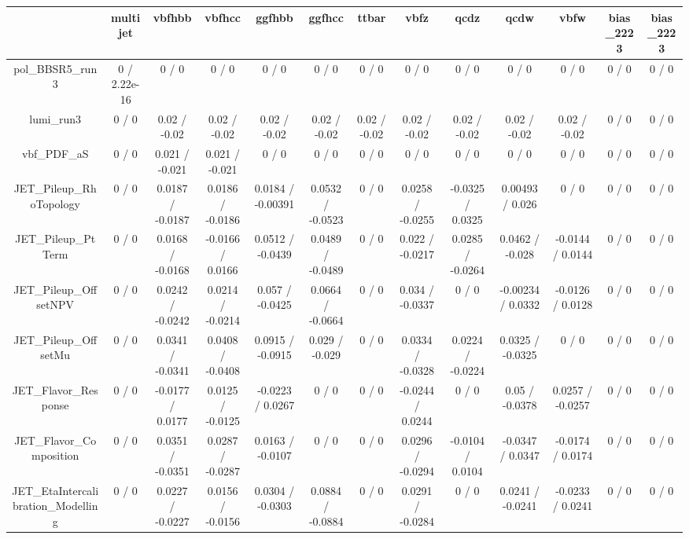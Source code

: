\documentclass[10pt]{article}
\begin{document}
\begin{table}[htbp]
\begin{center}
\begin{tabular}{|c|c|c|c|c|c|c|c|c|c|c|c|c|}
\hline 
      & multijet      & vbfhbb      & vbfhcc      & ggfhbb      & ggfhcc      & ttbar      & vbfz      & qcdz      & qcdw      & vbfw      & bias_2223      & bias_2223 \\ 
\hline 
  pol_BBSR5_run3 & 0 / 2.22e-16 & 0 / 0 & 0 / 0 & 0 / 0 & 0 / 0 & 0 / 0 & 0 / 0 & 0 / 0 & 0 / 0 & 0 / 0 & 0 / 0 & 0 / 0 \\ 
  lumi_run3 & 0 / 0 & 0.02 / -0.02 & 0.02 / -0.02 & 0.02 / -0.02 & 0.02 / -0.02 & 0.02 / -0.02 & 0.02 / -0.02 & 0.02 / -0.02 & 0.02 / -0.02 & 0.02 / -0.02 & 0 / 0 & 0 / 0 \\ 
  vbf_PDF_aS & 0 / 0 & 0.021 / -0.021 & 0.021 / -0.021 & 0 / 0 & 0 / 0 & 0 / 0 & 0 / 0 & 0 / 0 & 0 / 0 & 0 / 0 & 0 / 0 & 0 / 0 \\ 
  JET_Pileup_RhoTopology & 0 / 0 & 0.0187 / -0.0187 & 0.0186 / -0.0186 & 0.0184 / -0.00391 & 0.0532 / -0.0523 & 0 / 0 & 0.0258 / -0.0255 & -0.0325 / 0.0325 & 0.00493 / 0.026 & 0 / 0 & 0 / 0 & 0 / 0 \\ 
  JET_Pileup_PtTerm & 0 / 0 & 0.0168 / -0.0168 & -0.0166 / 0.0166 & 0.0512 / -0.0439 & 0.0489 / -0.0489 & 0 / 0 & 0.022 / -0.0217 & 0.0285 / -0.0264 & 0.0462 / -0.028 & -0.0144 / 0.0144 & 0 / 0 & 0 / 0 \\ 
  JET_Pileup_OffsetNPV & 0 / 0 & 0.0242 / -0.0242 & 0.0214 / -0.0214 & 0.057 / -0.0425 & 0.0664 / -0.0664 & 0 / 0 & 0.034 / -0.0337 & 0 / 0 & -0.00234 / 0.0332 & -0.0126 / 0.0128 & 0 / 0 & 0 / 0 \\ 
  JET_Pileup_OffsetMu & 0 / 0 & 0.0341 / -0.0341 & 0.0408 / -0.0408 & 0.0915 / -0.0915 & 0.029 / -0.029 & 0 / 0 & 0.0334 / -0.0328 & 0.0224 / -0.0224 & 0.0325 / -0.0325 & 0 / 0 & 0 / 0 & 0 / 0 \\ 
  JET_Flavor_Response & 0 / 0 & -0.0177 / 0.0177 & 0.0125 / -0.0125 & -0.0223 / 0.0267 & 0 / 0 & 0 / 0 & -0.0244 / 0.0244 & 0 / 0 & 0.05 / -0.0378 & 0.0257 / -0.0257 & 0 / 0 & 0 / 0 \\ 
  JET_Flavor_Composition & 0 / 0 & 0.0351 / -0.0351 & 0.0287 / -0.0287 & 0.0163 / -0.0107 & 0 / 0 & 0 / 0 & 0.0296 / -0.0294 & -0.0104 / 0.0104 & -0.0347 / 0.0347 & -0.0174 / 0.0174 & 0 / 0 & 0 / 0 \\ 
  JET_EtaIntercalibration_Modelling & 0 / 0 & 0.0227 / -0.0227 & 0.0156 / -0.0156 & 0.0304 / -0.0303 & 0.0884 / -0.0884 & 0 / 0 & 0.0291 / -0.0284 & 0 / 0 & 0.0241 / -0.0241 & -0.0233 / 0.0241 & 0 / 0 & 0 / 0 \\ 

\end{tabular}
\end{center}
\end{table}
\end{document}
